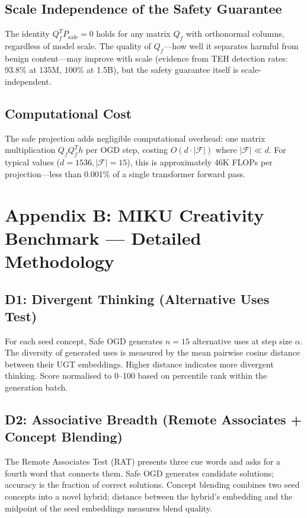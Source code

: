\documentclass[11pt,a4paper]{article}
\theoremstyle{plain}\newtheorem{theorem}{Theorem}[section]
\begin{document}
\subsection{Scale Independence of the Safety Guarantee}

The identity $Q_f^T P_{\mathrm{safe}} = 0$ holds for any matrix $Q_f$ with orthonormal columns, regardless of model scale. The quality of $Q_f$---how well it separates harmful from benign content---may improve with scale (evidence from TEH detection rates: 93.8\% at 135M, 100\% at 1.5B), but the safety guarantee itself is scale-independent.

\subsection{Computational Cost}

The safe projection adds negligible computational overhead: one matrix multiplication $Q_f Q_f^T h$ per OGD step, costing $O(d \cdot |\mathcal{F}|)$ where $|\mathcal{F}| \ll d$. For typical values ($d=1536, |\mathcal{F}|=15$), this is approximately 46K FLOPs per projection---less than 0.001\% of a single transformer forward pass.

\newpage

\section{Appendix B: MIKU Creativity Benchmark --- Detailed Methodology}

\subsection{D1: Divergent Thinking (Alternative Uses Test)}

For each seed concept, Safe OGD generates $n=15$ alternative uses at step size $\alpha$. The diversity of generated uses is measured by the mean pairwise cosine distance between their UGT embeddings. Higher distance indicates more divergent thinking. Score normalised to 0--100 based on percentile rank within the generation batch.

\subsection{D2: Associative Breadth (Remote Associates + Concept Blending)}

The Remote Associates Test (RAT) presents three cue words and asks for a fourth word that connects them. Safe OGD generates candidate solutions; accuracy is the fraction of correct solutions. Concept blending combines two seed concepts into a novel hybrid; distance between the hybrid's embedding and the midpoint of the seed embeddings measures blend quality.
\end{document}

